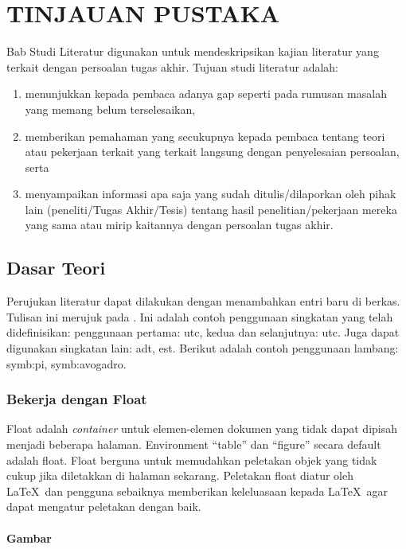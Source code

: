\chapter{TINJAUAN PUSTAKA}

Bab Studi Literatur digunakan untuk mendeskripsikan kajian literatur yang terkait dengan persoalan tugas akhir. Tujuan studi literatur adalah:

\begin{enumerate}
    \item menunjukkan kepada pembaca adanya gap seperti pada rumusan masalah yang memang belum terselesaikan,
    \item memberikan pemahaman yang secukupnya kepada pembaca tentang teori atau pekerjaan terkait yang terkait langsung dengan penyelesaian persoalan, serta
    \item menyampaikan informasi apa saja yang sudah ditulis/dilaporkan oleh pihak lain (peneliti/Tugas Akhir/Tesis) tentang hasil penelitian/pekerjaan mereka yang sama atau mirip kaitannya dengan persoalan tugas akhir.
\end{enumerate}

\section{Dasar Teori}
Perujukan literatur dapat dilakukan dengan menambahkan entri baru di berkas. Tulisan ini merujuk pada \parencite{knuth2001art}. Ini adalah contoh penggunaan singkatan yang telah didefinisikan: penggunaan pertama: \gls{utc}, kedua dan selanjutnya: \gls{utc}. Juga dapat digunakan singkatan lain: \gls{adt}, \gls{est}. Berikut adalah contoh penggunaan lambang: \gls{symb:pi}, \gls{symb:avogadro}.

    \subsection{Bekerja dengan Float}

    Float adalah \textit{container} untuk elemen-elemen dokumen yang tidak dapat dipisah menjadi beberapa halaman. Environment ``table'' dan ``figure'' secara default adalah float. Float berguna untuk memudahkan peletakan objek yang tidak cukup jika diletakkan di halaman sekarang. Peletakan float diatur oleh \LaTeX\ dan pengguna sebaiknya memberikan keleluasaan kepada \LaTeX\ agar dapat mengatur peletakan dengan baik. 
    
    \subsubsection{Gambar}
    
